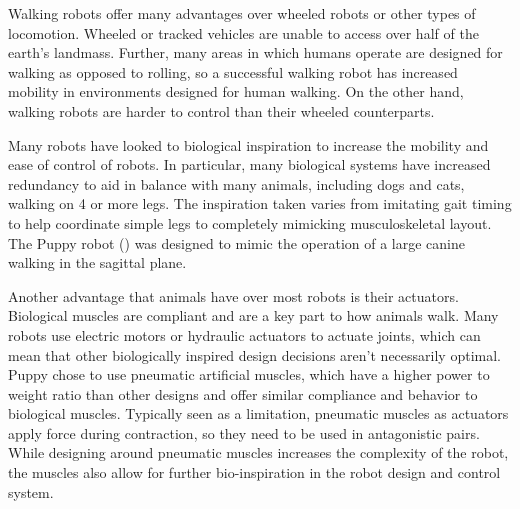 Walking robots offer many advantages over wheeled robots or other types
of locomotion. Wheeled or tracked vehicles are unable to access over half
of the earth's landmass. \cite{BigDog} Further, many areas in which humans
operate are designed for walking as opposed to rolling, so a successful walking
robot has increased mobility in environments designed for human walking. On the
other hand, walking robots are harder to control than their wheeled
counterparts.

Many robots have looked to biological inspiration to increase the mobility and
ease of control of robots. In particular, many biological systems have increased
redundancy to aid in balance with many animals, including dogs and cats, walking
on 4 or more legs. The inspiration taken varies from imitating gait timing to
help coordinate simple legs to completely mimicking musculoskeletal layout. The
Puppy robot () was designed to mimic the operation of a large 
canine walking in the sagittal plane. \cite{PuppyDesign}

Another advantage that animals have over most robots is their actuators.
Biological muscles are compliant and are a key part to how animals walk. Many
robots use electric motors or hydraulic actuators to actuate joints, which can
mean that other biologically inspired design decisions aren't necessarily
optimal. Puppy chose to use pneumatic artificial muscles, which have a higher
power to weight ratio than other designs and offer similar compliance and
behavior to biological muscles. \cite{Tavakoli2008} Typically seen as a
limitation, pneumatic muscles as actuators apply force during contraction, so
they need to be used in antagonistic pairs. While designing around pneumatic muscles increases the complexity
of the robot, the muscles also allow for further bio-inspiration in the robot design
and control system.

